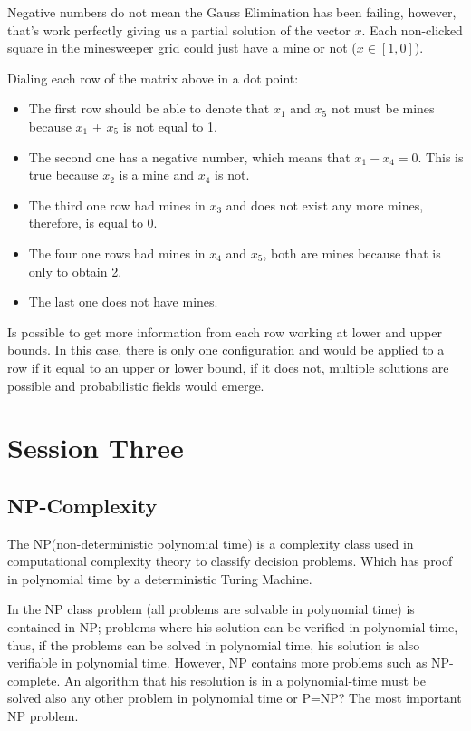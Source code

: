 \documentclass[a4paper]{article}
\numberwithin{equation}{subsection}
\begin{document}
\vspace{5mm} %

Negative numbers do not mean the Gauss Elimination has been failing, however, that’s work perfectly giving us a partial solution of the vector $x$.  Each non-clicked square in the minesweeper grid could just have a mine or not ($x\in [1,0]$).

\vspace{5mm} %

Dialing each row of the matrix above in a dot point:

\begin{itemize}
  \item The first row should be able to denote that $x_1$ and $x_5$ not must be mines because $x_1$ + $x_5$ is not equal to 1.

  \item The second one has a negative number, which means that $x_1 - x_4 = 0$. This is true because $x_2$ is a mine and $x_4$ is not.
  \item The third one row had mines in $x_3$ and does not exist any more mines, therefore, is equal to 0.
\item The four one rows had mines in $x_4$ and $x_5$, both are mines because that is only to obtain 2.
\item The last one does not have mines. 
\end{itemize}

Is possible to get more information from each row working at lower and upper bounds. In this case, there is only one configuration and would be applied to a row if it equal to an upper or lower bound, if it does not, multiple solutions are possible and probabilistic fields would emerge.

\section{Session Three} \label{chap:3}
\subsection{NP-Complexity}

The NP(non-deterministic polynomial time) is a complexity class used in computational complexity theory to classify decision problems. Which has proof in polynomial time by a deterministic Turing Machine. 

\vspace{5mm} %
In the NP class problem (all problems are solvable in polynomial time) is contained in NP; problems where his solution can be verified in polynomial time, thus, if the problems can be solved in polynomial time, his solution is also verifiable in polynomial time. However, NP contains more problems such as NP-complete. An algorithm that his resolution is in a polynomial-time must be solved also any other problem in polynomial time or P=NP? The most important NP problem.
\end{document}
